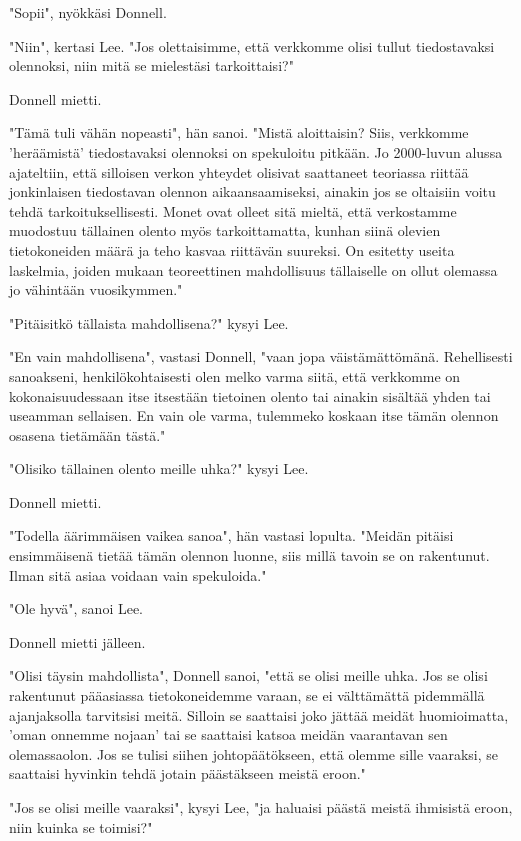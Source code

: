 "Sopii", nyökkäsi Donnell.


"Niin", kertasi Lee. "Jos olettaisimme, että verkkomme olisi tullut tiedostavaksi olennoksi, niin mitä se mielestäsi tarkoittaisi?"


Donnell mietti.


"Tämä tuli vähän nopeasti", hän sanoi. "Mistä aloittaisin? Siis, verkkomme 'heräämistä' tiedostavaksi olennoksi on spekuloitu pitkään. Jo 2000-luvun alussa ajateltiin, että silloisen verkon yhteydet olisivat saattaneet teoriassa riittää jonkinlaisen tiedostavan olennon aikaansaamiseksi, ainakin jos se oltaisiin voitu tehdä tarkoituksellisesti. Monet ovat olleet sitä mieltä, että verkostamme muodostuu tällainen olento myös tarkoittamatta, kunhan siinä olevien tietokoneiden määrä ja teho kasvaa riittävän suureksi. On esitetty useita laskelmia, joiden mukaan teoreettinen mahdollisuus tällaiselle on ollut olemassa jo vähintään vuosikymmen."


"Pitäisitkö tällaista mahdollisena?" kysyi Lee.


"En vain mahdollisena", vastasi Donnell, "vaan jopa väistämättömänä. Rehellisesti sanoakseni, henkilökohtaisesti olen melko varma siitä, että verkkomme on kokonaisuudessaan itse itsestään tietoinen olento tai ainakin sisältää yhden tai useamman sellaisen. En vain ole varma, tulemmeko koskaan itse tämän olennon osasena tietämään tästä."


"Olisiko tällainen olento meille uhka?" kysyi Lee.


Donnell mietti.


"Todella äärimmäisen vaikea sanoa", hän vastasi lopulta. "Meidän pitäisi ensimmäisenä tietää tämän olennon luonne, siis millä tavoin se on rakentunut. Ilman sitä asiaa voidaan vain spekuloida."


"Ole hyvä", sanoi Lee.


Donnell mietti jälleen.


"Olisi täysin mahdollista", Donnell sanoi, "että se olisi meille uhka. Jos se olisi rakentunut pääasiassa tietokoneidemme varaan, se ei välttämättä pidemmällä ajanjaksolla tarvitsisi meitä. Silloin se saattaisi joko jättää meidät huomioimatta, 'oman onnemme nojaan' tai se saattaisi katsoa meidän vaarantavan sen olemassaolon. Jos se tulisi siihen johtopäätökseen, että olemme sille vaaraksi, se saattaisi hyvinkin tehdä jotain päästäkseen meistä eroon."


"Jos se olisi meille vaaraksi", kysyi Lee, "ja haluaisi päästä meistä ihmisistä eroon, niin kuinka se toimisi?"


